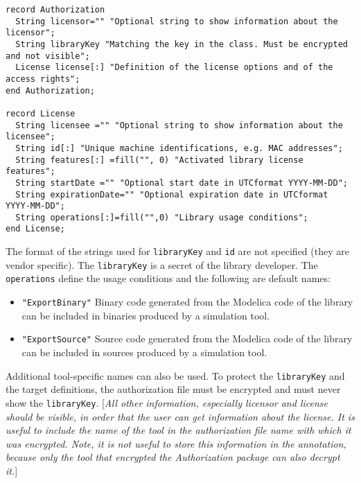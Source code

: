 \begin{lstlisting}[language=modelica]
record Authorization
  String licensor="" "Optional string to show information about the licensor";
  String libraryKey "Matching the key in the class. Must be encrypted and not visible";
  License license[:] "Definition of the license options and of the access rights";
end Authorization;

record License
  String licensee ="" "Optional string to show information about the licensee";
  String id[:] "Unique machine identifications, e.g. MAC addresses";
  String features[:] =fill("", 0) "Activated library license features";
  String startDate ="" "Optional start date in UTCformat YYYY-MM-DD";
  String expirationDate="" "Optional expiration date in UTCformat YYYY-MM-DD";
  String operations[:]=fill("",0) "Library usage conditions";
end License;
\end{lstlisting}
The format of the strings used for \lstinline!libraryKey! and \lstinline!id! are not specified
(they are vendor specific). The \lstinline!libraryKey! is a secret of the library
developer. The \lstinline!operations! define the usage conditions and the following
are default names:

\begin{itemize}
\item
  \lstinline!"ExportBinary"! Binary code generated from the Modelica code of the
  library can be included in binaries produced by a simulation
  tool.
\item
  \lstinline!"ExportSource"! Source code generated from the Modelica code of the
  library can be included in sources produced by a simulation tool.
\end{itemize}

Additional tool-specific names can also be used. To protect the
\lstinline!libraryKey! and the target definitions, the authorization file must
be encrypted and must never show the \lstinline!libraryKey!. {[}\emph{All other
information, especially licensor and license should be visible, in order
that the user can get information about the license. It is useful to
include the name of the tool in the authorization file name with which
it was encrypted. Note, it is not useful to store this information in
the annotation, because only the tool that encrypted the Authorization
package can also decrypt it.}{]}


